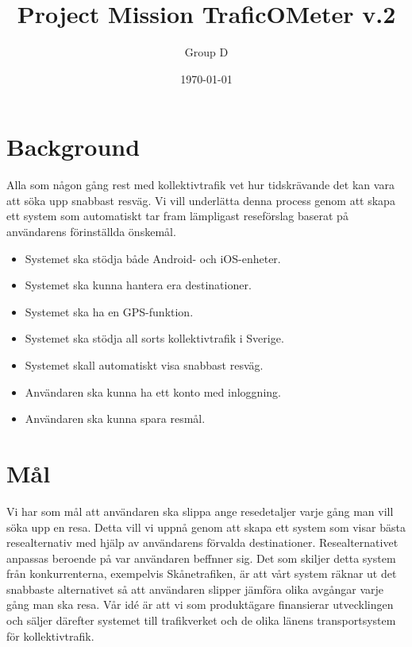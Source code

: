 \documentclass[a4paper]{article}
\title{Project Mission TraficOMeter v.2}
\author{Group D}
\date{\today}
\begin{document}
	\maketitle
	\thispagestyle{empty}
	\setcounter{page}{0}
	\pagebreak
	\tableofcontents
	\pagebreak

	\section{Background} %
	\label{sec:background}
		Alla som någon gång rest med kollektivtrafik vet hur tidskrävande det kan vara att söka upp
snabbast resväg. Vi vill underlätta denna process genom att skapa ett system som automatiskt
tar fram lämpligast reseförslag baserat på användarens förinställda önskemål.
	

		\begin{itemize}
			\item Systemet ska stödja både Android- och iOS-enheter.
			\item Systemet ska kunna hantera era destinationer.
			\item Systemet ska ha en GPS-funktion.
			\item Systemet ska stödja all sorts kollektivtrafik i Sverige.
			\item Systemet skall automatiskt visa snabbast resväg.
			\item Användaren ska kunna ha ett konto med inloggning.
			\item Användaren ska kunna spara resmål.
		\end{itemize}

	\section{Mål} %
	\label{sec:m_l}
		Vi har som mål att användaren ska slippa ange resedetaljer varje gång man vill söka upp en resa. Detta vill vi uppnå genom att skapa ett system som visar bästa resealternativ med hjälp av användarens förvalda destinationer. Resealternativet anpassas beroende på var användaren beffnner sig. Det som skiljer detta system från konkurrenterna, exempelvis Skånetrafiken, är att vårt system räknar ut det snabbaste alternativet så att användaren slipper jämföra olika avgångar varje gång man ska resa. Vår idé är att vi som produktägare finansierar utvecklingen och säljer därefter systemet till trafikverket och de olika länens transportsystem för kollektivtrafik.
\end{document}
